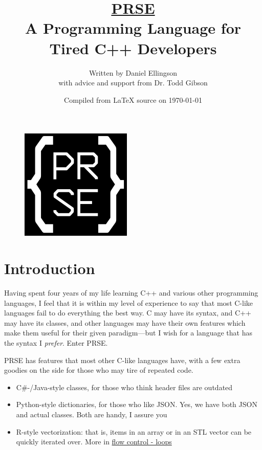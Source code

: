 \documentclass[letterpaper, 12pt]{article}
\begin{document}
\title{\underline{PRSE}\\ A Programming Language for Tired C++ Developers}
\author{Written by Daniel Ellingson\\with advice and support from Dr. Todd Gibson}
\date{Compiled from {\LaTeX} source on \today}
\maketitle

\newpage

\begin{figure}
   \begin{center}
      \vspace*{-8cm}
      \includegraphics{logo}
   \end{center}
\end{figure}
\clearpage

\newpage

\tableofcontents

\newpage

\section{Introduction}
Having spent four years of my life learning C++ and various other programming languages, I feel that
it is within my level of experience to say that most C-like languages fail to do everything the best
way. C may have its syntax, and C++ may have its classes, and other languages may have their own
features which make them useful for their given paradigm---but I wish for a language that has the
syntax I {\em prefer}. Enter PRSE.\linebreak

PRSE has features that most other C-like languages have, with a few extra goodies on the side for
those who may tire of repeated code.

\begin{itemize}
\item C\#-/Java-style classes, for those who think header files are outdated
\item Python-style dictionaries, for those who like JSON. Yes, we have both JSON and actual classes.
   Both are handy, I assure you
\item R-style vectorization: that is, items in an array or in an STL vector can be quickly iterated
   over. More in \hyperref[sec:flowcontrol-loops]{flow control - loops}
\end{itemize}
\end{document}
